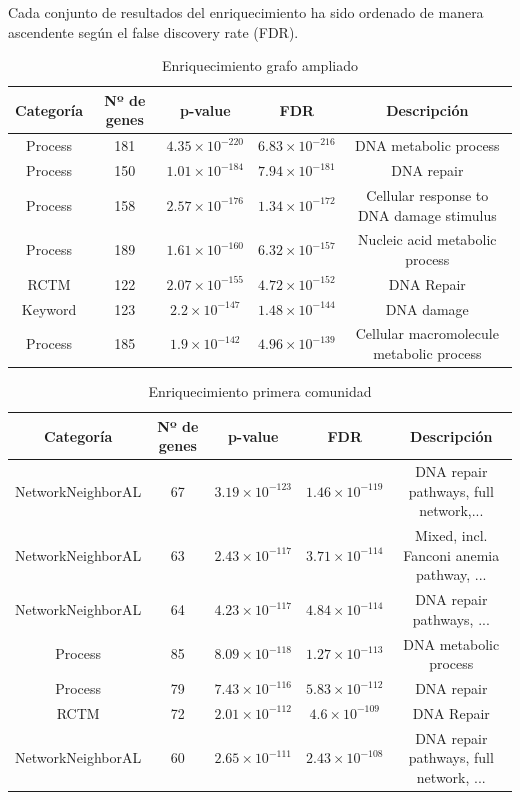 Cada conjunto de resultados del enriquecimiento ha sido ordenado de manera ascendente según el false discovery rate (FDR).


\begin{table}[h]
	\centering
	\caption{Enriquecimiento grafo ampliado}
	\label{tabla:enrique200}
	\begin{tabular}{|c|c|c|c|c|}
		\hline
		\textbf{Categoría} & \textbf{Nº de genes} & \textbf{p-value} & \textbf{FDR} & \textbf{Descripción} \\
		\hline
		Process & 181 & $4.35 \times 10^{-220}$ & $6.83 \times 10^{-216}$ & DNA metabolic process \\
		Process & 150 & $1.01 \times 10^{-184}$ & $7.94 \times 10^{-181}$ & DNA repair \\
		Process & 158 & $2.57 \times 10^{-176}$ & $1.34 \times 10^{-172}$ & Cellular response to DNA damage stimulus \\
		Process & 189 & $1.61 \times 10^{-160}$ & $6.32 \times 10^{-157}$ & Nucleic acid metabolic process \\
		RCTM & 122 & $2.07 \times 10^{-155}$ & $4.72 \times 10^{-152}$ & DNA Repair \\

		Keyword & 123 & $2.2 \times 10^{-147}$ & $1.48 \times 10^{-144}$ & DNA damage \\
		Process & 185 & $1.9 \times 10^{-142}$ & $4.96 \times 10^{-139}$ & Cellular macromolecule metabolic process \\
		\hline
	\end{tabular}
\end{table}


\begin{table}[h]
	\centering
	\caption{Enriquecimiento primera comunidad}
	\label{tabla:enrique1}
	\begin{tabular}{|c|c|c|c|c|}
		\hline
		\textbf{Categoría} & \textbf{Nº de genes} & \textbf{p-value} & \textbf{FDR} & \textbf{Descripción} \\
		\hline
		NetworkNeighborAL & 67 & $3.19 \times 10^{-123}$ & $1.46 \times 10^{-119}$ & DNA repair pathways, full network,...\\
		NetworkNeighborAL & 63 & $2.43 \times 10^{-117}$ & $3.71 \times 10^{-114}$ & Mixed, incl. Fanconi anemia pathway, ... \\
		NetworkNeighborAL & 64 & $4.23 \times 10^{-117}$ & $4.84 \times 10^{-114}$ & DNA repair pathways, ...\\
		Process & 85 & $8.09 \times 10^{-118}$ & $1.27 \times 10^{-113}$ & DNA metabolic process \\
		Process & 79 & $7.43 \times 10^{-116}$ & $5.83 \times 10^{-112}$ & DNA repair \\
		RCTM & 72 & $2.01 \times 10^{-112}$ & $4.6 \times 10^{-109}$ & DNA Repair \\
		NetworkNeighborAL & 60 & $2.65 \times 10^{-111}$ & $2.43 \times 10^{-108}$ & DNA repair pathways, full network, ... \\
		\hline
	\end{tabular}
\end{table}

